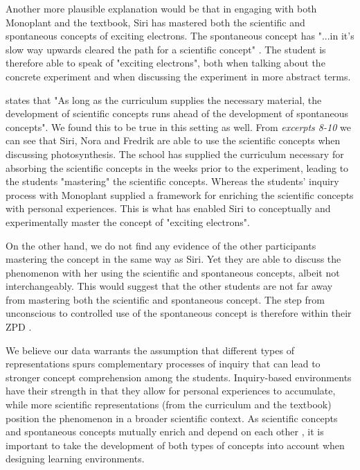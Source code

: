 Another more plausible explanation would be that in engaging with both Monoplant and the textbook, Siri has mastered both the scientific and spontaneous concepts of exciting electrons. The spontaneous concept has "...in it's slow way upwards cleared the path for a scientific concept" \citep[p. 194]{vygotsky2012thought}. The student is therefore able to speak of "exciting electrons", both when talking about the concrete experiment and when discussing the experiment in more abstract terms. 

\citet[p. 147]{vygotsky2012thought} states that "As long as the curriculum supplies the necessary material, the development of scientific concepts runs ahead of the development of spontaneous concepts". We found this to be true in this setting as well. From \emph{excerpts 8-10} we can see that Siri, Nora and Fredrik are able to use the scientific concepts when discussing photosynthesis. The school has supplied the curriculum necessary for absorbing the scientific concepts in the weeks prior to the experiment, leading to the students "mastering" the scientific concepts. Whereas the students' inquiry process with Monoplant supplied a framework for enriching the scientific concepts with personal experiences. This is what has enabled Siri to conceptually and experimentally master the concept of "exciting electrons".  

On the other hand, we do not find any evidence of the other participants mastering the concept in the same way as Siri. Yet they are able to discuss the phenomenon with her using the scientific and spontaneous concepts, albeit not interchangeably. This would suggest that the other students are not far away from mastering both the scientific and spontaneous concept. The step from unconscious to controlled use of the spontaneous concept is therefore within their ZPD \citep{vygotsky2012thought}. 

We believe our data warrants the assumption that different types of representations spurs complementary processes of inquiry that can lead to stronger concept comprehension among the students. Inquiry-based environments have their strength in that they allow for personal experiences to accumulate, while more scientific representations (from the curriculum and the textbook) position the phenomenon in a broader scientific context. As scientific concepts and spontaneous concepts mutually enrich and depend on each other \citep{vygotsky2012thought}, it is important to take the development of both types of concepts into account when designing learning environments. 

